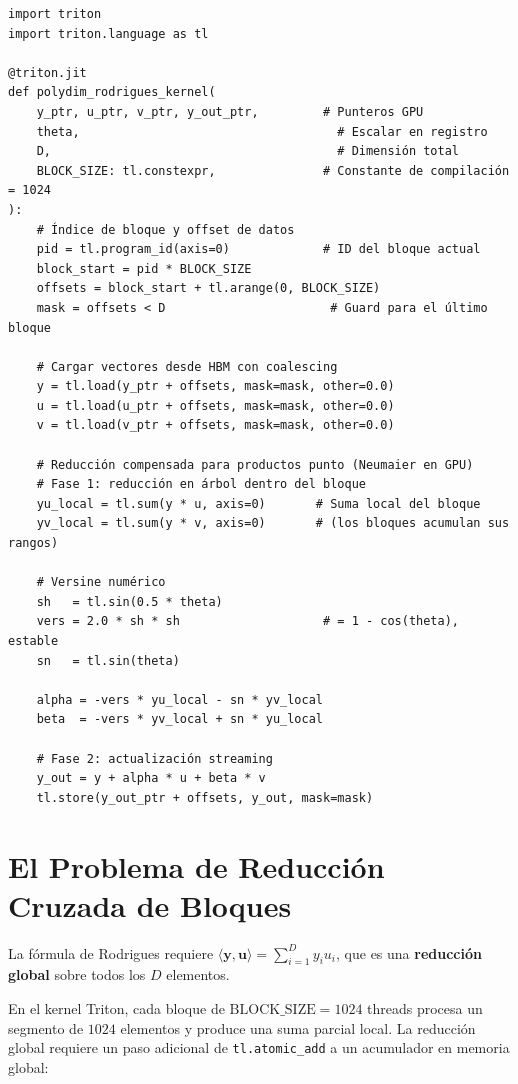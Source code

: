 \begin{lstlisting}[style=pythonstyle, caption={Estructura del kernel Triton POLYDIM}, label=lst:triton_structure]
import triton
import triton.language as tl

@triton.jit
def polydim_rodrigues_kernel(
    y_ptr, u_ptr, v_ptr, y_out_ptr,         # Punteros GPU
    theta,                                    # Escalar en registro
    D,                                        # Dimensión total
    BLOCK_SIZE: tl.constexpr,               # Constante de compilación = 1024
):
    # Índice de bloque y offset de datos
    pid = tl.program_id(axis=0)             # ID del bloque actual
    block_start = pid * BLOCK_SIZE
    offsets = block_start + tl.arange(0, BLOCK_SIZE)
    mask = offsets < D                       # Guard para el último bloque

    # Cargar vectores desde HBM con coalescing
    y = tl.load(y_ptr + offsets, mask=mask, other=0.0)
    u = tl.load(u_ptr + offsets, mask=mask, other=0.0)
    v = tl.load(v_ptr + offsets, mask=mask, other=0.0)

    # Reducción compensada para productos punto (Neumaier en GPU)
    # Fase 1: reducción en árbol dentro del bloque
    yu_local = tl.sum(y * u, axis=0)       # Suma local del bloque
    yv_local = tl.sum(y * v, axis=0)       # (los bloques acumulan sus rangos)

    # Versine numérico
    sh   = tl.sin(0.5 * theta)
    vers = 2.0 * sh * sh                    # = 1 - cos(theta), estable
    sn   = tl.sin(theta)

    alpha = -vers * yu_local - sn * yv_local
    beta  = -vers * yv_local + sn * yu_local

    # Fase 2: actualización streaming
    y_out = y + alpha * u + beta * v
    tl.store(y_out_ptr + offsets, y_out, mask=mask)
\end{lstlisting}

\section{El Problema de Reducción Cruzada de Bloques}

La fórmula de Rodrigues requiere $\langle\mathbf{y}, \mathbf{u}\rangle = \sum_{i=1}^D y_i u_i$,
que es una \textbf{reducción global} sobre todos los $D$ elementos.

En el kernel Triton, cada bloque de $\text{BLOCK\_SIZE} = 1024$ threads procesa un
segmento de $1024$ elementos y produce una suma parcial local. La reducción global
requiere un paso adicional de \texttt{tl.atomic\_add} a un acumulador en memoria global:

